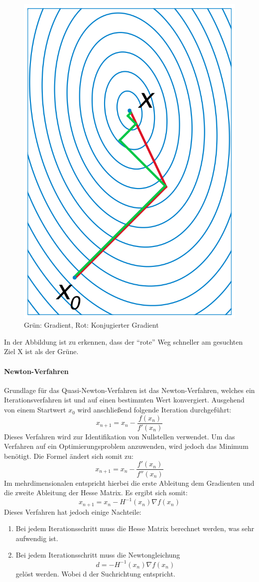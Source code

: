 					\begin{figure}[h]
						\centering
						\includegraphics[width=0.3\linewidth]{./pics/ma/konjug.png}
						\caption{Grün: Gradient, Rot: Konjugierter Gradient}
						\label{}
					\end{figure}
					In der Abbildung ist zu erkennen, dass der "`rote"' Weg schneller am gesuchten Ziel X ist als der Grüne. 
				\paragraph{Newton-Verfahren}
					Grundlage für das Quasi-Newton-Verfahren ist das Newton-Verfahren, welches ein Iterationsverfahren ist und auf einen bestimmten Wert konvergiert. Ausgehend von einem Startwert $x_0$ wird anschließend folgende Iteration durchgeführt:
					\[ x_{n+1}= x_n - \frac{f(x_n)}{f'(x_n)}\]
					Dieses Verfahren wird zur Identifikation von Nullstellen verwendet. Um das Verfahren auf ein Optimierungsproblem anzuwenden, wird jedoch das Minimum benötigt. Die Formel ändert sich somit zu:
					\[ x_{n+1}= x_n - \frac{f'(x_n)}{f''(x_n)}\]
					Im mehrdimensionalen entspricht hierbei die erste Ableitung dem Gradienten und die zweite Ableitung der Hesse Matrix. Es ergibt sich somit:
					\[ x_{n+1}= x_n - H^{-1}(x_n)\nabla f(x_n)\]
					Dieses Verfahren hat jedoch einige Nachteile:	
					\begin{enumerate}
						\item Bei jedem Iterationsschritt muss die Hesse Matrix berechnet werden, was sehr aufwendig ist.
						
						\item Bei jedem Iterationsschritt muss die Newtongleichung
						\[d = - H^{-1}(x_n)\nabla f(x_n)\]
						gelöst werden. Wobei d der Suchrichtung entspricht. 
					\end{enumerate}
					
					
